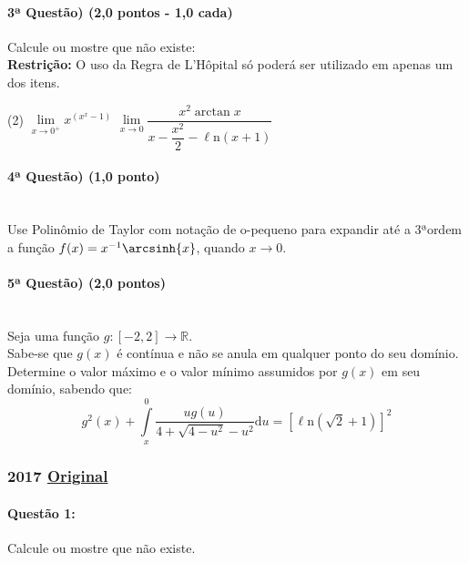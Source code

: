 \documentclass[12pt,a4paper]{article}
\newcommand{\dd}{\mathrm{d}}
\newcommand{\Ln}{\ell\mathrm{n}}
\newcommand{\original}[1]{\tiny \href{#1}{Original} \normalsize}
\begin{document}
\paragraph{3ª Questão) (2,0 pontos - 1,0 cada)}


Calcule ou mostre que não existe:\\
\textbf{Restrição:} O uso da Regra de L'Hôpital só poderá ser utilizado em apenas um dos itens.

\begin{tasks}(2)
    \task $\lim\limits_{x \to 0^{+}} x^{(x^x-1)}$
    \task $\lim\limits_{x \to 0} \dfrac{x^2 \arctan{x}}{x - \dfrac{x^2}{2} - \Ln(x+1)}$

\end{tasks}

\paragraph{4ª Questão) (1,0 ponto)}\\

Use Polinômio de Taylor com notação de o-pequeno para expandir até a 3ªordem a função $f(x) = x^{-1} \arcsinh{x}$, quando $x \rightarrow 0$.

\paragraph{5ª Questão) (2,0 pontos)}\\

Seja uma função $g:[-2, 2] \rightarrow \mathbb{R}$.\\
Sabe-se que $g(x)$ é contínua e não se anula em qualquer ponto do seu domínio.\\
Determine o valor máximo e o valor mínimo assumidos por $g(x)$ em seu domínio, sabendo que: 
$$g^2(x) + \displaystyle\int\limits_{x}^{0} \dfrac{u g(u)}{4 + \sqrt{4 - u^2} - u^2} \dd u = [\Ln(\sqrt{2} + 1)]^2$$

\newpage

\subsubsection{2017 \original{https://drive.google.com/file/d/1Gs5HNH5wUFftXuSzlIBlEpWkF8WfEL2X/view?usp=sharing}}

\paragraph{Questão 1: }

Calcule ou mostre que não existe.
\end{document}
